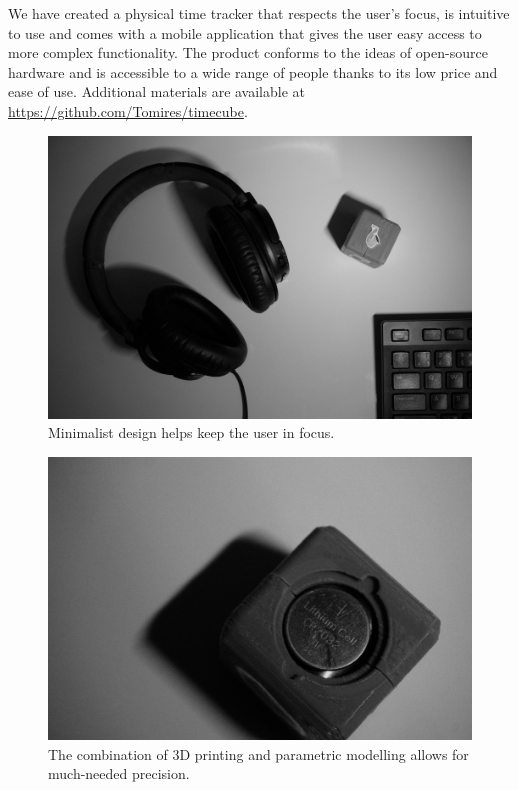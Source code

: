 \documentclass{article}
\begin{document}
We have created a physical time tracker that respects the user's focus, is intuitive to use and comes with a mobile application that gives the user easy access to more complex functionality. The product conforms to the ideas of open-source hardware and is accessible to a wide range of people thanks to its low price and ease of use. Additional materials are available at \url{https://github.com/Tomires/timecube}.

\newpage

\begin{figure}[H]
\centering
\includegraphics[scale=1.6]{cube2.jpg}
\caption{Minimalist design helps keep the user in focus.}
\label{fig:phones}
\end{figure}

\begin{figure}[H]
\centering
\includegraphics[scale=1.6]{battery_closeup.jpg}
\caption{The combination of 3D printing and parametric modelling allows for much-needed precision.}
\label{fig:battery}
\end{figure}
\end{document}
